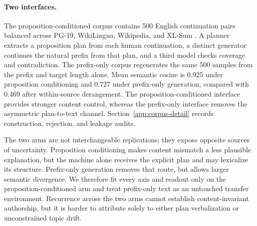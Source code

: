 \paragraph{Two interfaces.} The proposition-conditioned corpus contains 500 English continuation pairs balanced across PG-19, WikiLingua, Wikipedia, and XL-Sum \citep{rae2020compressive,ladhak2020wikilingua,wikimedia2023wikipedia,hasan2021xlsum}. A planner extracts a proposition plan from each human continuation, a distinct generator continues the natural prefix from that plan, and a third model checks coverage and contradiction. The prefix-only corpus regenerates the same 500 samples from the prefix and target length alone. Mean semantic cosine is 0.925 under proposition conditioning and 0.727 under prefix-only generation, compared with 0.469 after within-source derangement. The proposition-conditioned interface provides stronger content control, whereas the prefix-only interface removes the asymmetric plan-to-text channel. Section~\ref{app:corpus-detail} records construction, rejection, and leakage audits.

The two arms are not interchangeable replications; they expose opposite sources of uncertainty. Proposition conditioning makes content mismatch a less plausible explanation, but the machine alone receives the explicit plan and may lexicalize its structure. Prefix-only generation removes that route, but allows larger semantic divergence. We therefore fit every axis and readout only on the proposition-conditioned arm and treat prefix-only text as an untouched transfer environment. Recurrence across the two arms cannot establish content-invariant authorship, but it is harder to attribute solely to either plan verbalization or unconstrained topic drift.


